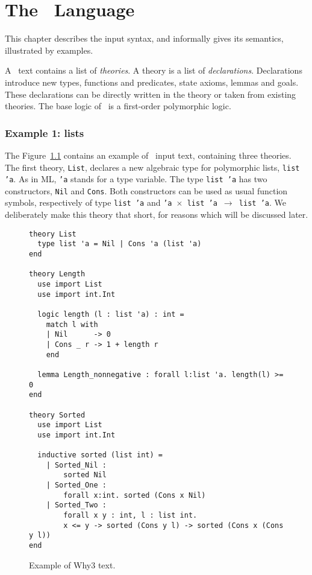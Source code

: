 \chapter{The \why\ Language}
\label{chap:syntax}

This chapter describes the input syntax, and informally gives its semantics,
illustrated by examples.

A \why\ text contains a list of \emph{theories}.
A theory is a list of \emph{declarations}. Declarations introduce new
types, functions and predicates, state axioms, lemmas and goals.
These declarations can be directly written in the theory or taken from
existing theories. The base logic of \why\ is a first-order
polymorphic logic.

\subsection{Example 1: lists}

The Figure~\ref{fig:tutorial1} contains an example of \why\ input
text, containing three theories. The first theory, \texttt{List},
declares a new algebraic type for polymorphic lists, \texttt{list 'a}.
As in ML, \texttt{'a} stands for a type variable.
The type \texttt{list 'a} has two constructors, \texttt{Nil} and
\texttt{Cons}. Both constructors can be used as usual function
symbols, respectively of type \texttt{list 'a} and \texttt{'a
  $\times$ list 'a $\rightarrow$ list 'a}.
We deliberately make this theory that short, for reasons which will be
discussed later.

\begin{figure}
\centering
\begin{verbatim}
theory List
  type list 'a = Nil | Cons 'a (list 'a)
end

theory Length
  use import List
  use import int.Int

  logic length (l : list 'a) : int =
    match l with
    | Nil      -> 0
    | Cons _ r -> 1 + length r
    end

  lemma Length_nonnegative : forall l:list 'a. length(l) >= 0
end

theory Sorted
  use import List
  use import int.Int

  inductive sorted (list int) =
    | Sorted_Nil :
        sorted Nil
    | Sorted_One :
        forall x:int. sorted (Cons x Nil)
    | Sorted_Two :
        forall x y : int, l : list int.
        x <= y -> sorted (Cons y l) -> sorted (Cons x (Cons y l))
end
\end{verbatim}
\caption{Example of Why3 text.}
\label{fig:tutorial1}
\end{figure}

